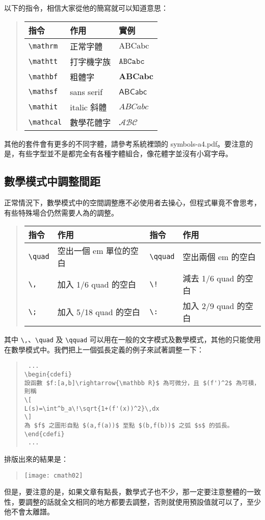 以下的指令，相信大家從他的簡寫就可以知道意思：

\begin{quote}
  \begin{tabular}{lll}
    指令                    & 作用        & 實例              \\
    \hline
    \verb|\mathrm| & 正常字體    & $\mathrm{ABCabc}$ \\
    \verb|\mathtt| & 打字機字族  & $\mathtt{ABCabc}$ \\
    \verb|\mathbf| & 粗體字      & $\mathbf{ABCabc}$ \\
    \verb|\mathsf| & sans serif  & $\mathsf{ABCabc}$ \\
    \verb|\mathit| & italic 斜體 & $\mathit{ABCabc}$ \\
    \verb|\mathcal| & 數學花體字  & $\mathcal{ABC}$
  \end{tabular}
\end{quote}

其他的套件會有更多的不同字體，請參考系統裡頭的 {\ttfamily symbols-a4.pdf}。要注意的是，有些字型並不是都完全有各種字體組合，像花體字並沒有小寫字母。

\subsection{數學模式中調整間距}

正常情況下，數學模式中的空間調整應不必使用者去操心，但程式畢竟不會思考，有些特殊場合仍然需要人為的調整。

\begin{quote}
  \begin{tabular}{llll}
    指令                    & 作用                   & 指令                    & 作用                 \\
    \hline
    \verb|\quad| & 空出一個 em 單位的空白 & \verb|\qquad| & 空出兩個 em 的空白   \\
    \verb|\,| & 加入 1/6 quad 的空白   & \verb|\!| & 減去 1/6 quad 的空白 \\
    \verb|\;| & 加入 5/18 quad 的空白  & \verb|\:| & 加入 2/9 quad 的空白
  \end{tabular}
\end{quote}

其中 \verb|\,|、\verb|\quad| 及 \verb|\qquad| 可以用在一般的文字模式及數學模式，其他的只能使用在數學模式中。我們把上一個弧長定義的例子來試著調整一下：

\begin{quote}
  \begin{verbatim}
 ...
\begin{cdefi}
設函數 $f:[a,b]\rightarrow{\mathbb R}$ 為可微分，且 $(f')^2$ 為可積，則稱
\[
L(s)=\int^b_a\!\sqrt{1+(f'(x))^2}\,dx
\]
為 $f$ 之圖形自點 $(a,f(a))$ 至點 $(b,f(b))$ 之弧 $s$ 的弧長。
\end{cdefi}
 ...
\end{verbatim}
\end{quote}

排版出來的結果是：

\begin{quote}
  \texttt{[image: cmath02]}
\end{quote}

但是，要注意的是，如果文章有點長，數學式子也不少，那一定要注意整體的一致性，要調整的話就全文相同的地方都要去調整，否則就使用預設值就可以了，至少他不會太離譜。